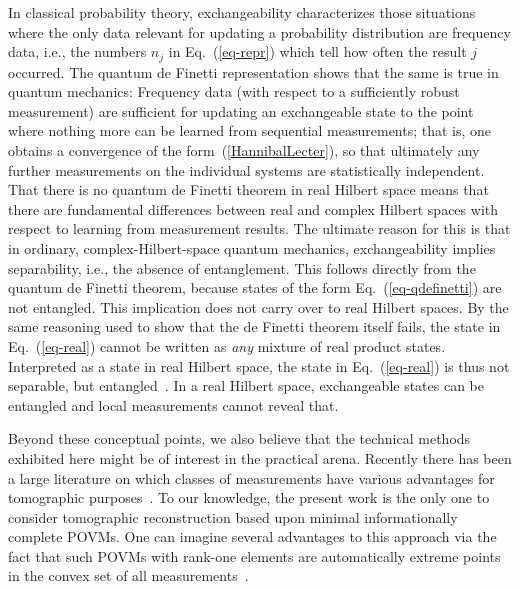 \documentclass[12pt,aps,eqsecnum]{revtex4-1}
\begin{document}
In classical probability theory, exchangeability characterizes
those situations where the only data relevant for updating a
probability distribution are frequency data, i.e., the numbers
$n_j$ in Eq.~(\ref{eq-repr}) which tell how often the result $j$
occurred. The quantum de Finetti representation shows that the
same is true in quantum mechanics:  Frequency data (with respect
to a sufficiently robust measurement) are sufficient for updating
an exchangeable state to the point where nothing more can be
learned from sequential measurements; that is, one obtains a
convergence of the form~(\ref{HannibalLecter}), so that ultimately
any further measurements on the individual systems are
statistically independent. That there is no quantum de Finetti
theorem in real Hilbert space means that there are fundamental
differences between real and complex Hilbert spaces with respect
to learning from measurement results.  The ultimate reason for
this is that in ordinary, complex-Hilbert-space quantum mechanics,
exchangeability implies separability, i.e., the absence of
entanglement.  This follows directly from the quantum de Finetti
theorem, because states of the form Eq.~(\ref{eq-qdefinetti}) are
not entangled.  This implication does not carry over to real
Hilbert spaces.  By the same reasoning used to show that the de
Finetti theorem itself fails, the state in Eq.~(\ref{eq-real})
cannot be written as {\it any\/} mixture of real product states.
Interpreted as a state in real Hilbert space, the state in
Eq.~(\ref{eq-real}) is thus not separable, but
entangled~\cite{Caves2000}. In a real Hilbert space, exchangeable
states can be entangled and local measurements cannot reveal that.

Beyond these conceptual points, we also believe that the technical
methods exhibited here might be of interest in the practical arena.
Recently there has been a large literature on which classes of
measurements have various advantages for tomographic
purposes~\cite{QuorumLump,QuorumOld}.  To our knowledge, the present
work is the only one to consider tomographic reconstruction based
upon minimal informationally complete POVMs. One can imagine several
advantages to this approach via the fact that such POVMs with
rank-one elements are automatically extreme points in the convex set
of all measurements~\cite{Fujiwara1998}.
\end{document}
